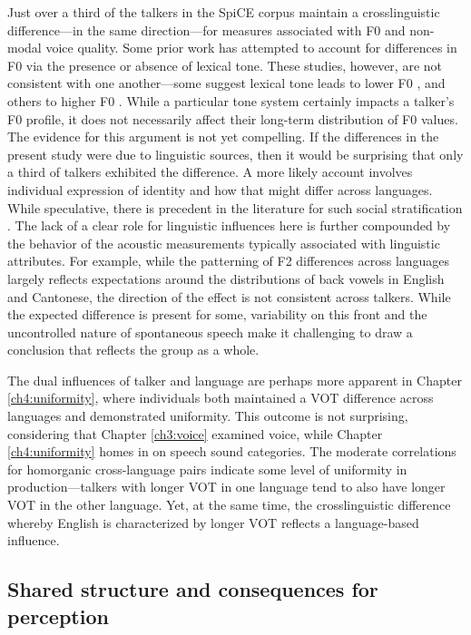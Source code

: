 Just over a third of the talkers in the SpiCE corpus maintain a crosslinguistic difference---in the same direction---for measures associated with F0 and non-modal voice quality. Some prior work has attempted to account for differences in F0 via the presence or absence of lexical tone. These studies, however, are not consistent with one another---some suggest lexical tone leads to lower F0 \citep{ng_2012_ltas}, and others to higher F0 \citep{lee_2017_bilingual, keating_2012_f0}. While a particular tone system certainly impacts a talker's F0 profile, it does not necessarily affect their long-term distribution of F0 values. The evidence for this argument is not yet compelling. If the differences in the present study were due to linguistic sources, then it would be surprising that only a third of talkers exhibited the difference. A more likely account involves individual expression of identity and how that might differ across languages. While speculative, there is precedent in the literature for such social stratification \citep{loveday_1981_pitch, voigt_2016_between}. The lack of a clear role for linguistic influences here is further compounded by the behavior of the acoustic measurements typically associated with linguistic attributes. For example, while the patterning of F2 differences across languages largely reflects expectations around the distributions of back vowels in English and Cantonese, the direction of the effect is not consistent across talkers. While the expected difference is present for some, variability on this front and the uncontrolled nature of spontaneous speech make it challenging to draw a conclusion that reflects the group as a whole.

The dual influences of talker and language are perhaps more apparent in Chapter \ref{ch4:uniformity}, where individuals both maintained a VOT difference across languages and demonstrated uniformity. This outcome is not surprising, considering that Chapter \ref{ch3:voice} examined voice, while Chapter \ref{ch4:uniformity} homes in on speech sound categories. The moderate correlations for homorganic cross-language pairs indicate some level of uniformity in production---talkers with longer VOT in one language tend to also have longer VOT in the other language. Yet, at the same time, the crosslinguistic difference whereby English is characterized by longer VOT reflects a language-based influence. 

\subsection{Shared structure and consequences for perception}

